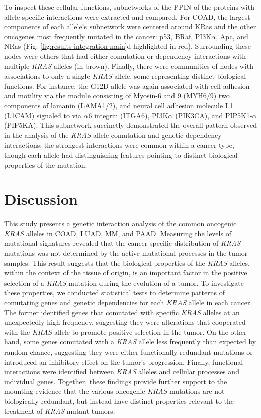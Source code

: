 \documentclass[english, 10pt, letterpaper]{article}
\newcommand{\KRAS}{\emph{KRAS}}
\newcommand{\kras}{KRas}
\begin{document}
To inspect these cellular functions, subnetworks of the PPIN of the proteins with allele-specific interactions were extracted and compared.
For COAD, the largest components of each allele's subnetwork were centered around \kras{} and the other oncogenes most frequently mutated in the cancer: p53, BRaf, PI3K$\alpha$, Apc, and NRas (Fig. \ref{fig:results-integration-main}d highlighted in red).
Surrounding these nodes were others that had either comutation or dependency interactions with multiple \KRAS{} alleles (in brown).
Finally, there were communities of nodes with associations to only a single \KRAS{} allele, some representing distinct biological functions.
For instance, the G12D allele was again associated with cell adhesion and motility via the module consisting of Myosin-6 and 9 (MYH6/9) two components of lamanin (LAMA1/2), and neural cell adhesion molecule L1 (L1CAM) signaled to via $\alpha$6 integrin (ITGA6), PI3K$\alpha$ (PIK3CA), and PIP5K1-$\alpha$ (PIP5KA).
This subnetwork succinctly demonstrated the overall pattern observed in the analysis of the \KRAS{} allele comutation and genetic dependency interactions: the strongest interactions were common within a cancer type, though each allele had distinguishing features pointing to distinct biological properties of the mutation.



\section*{Discussion}

This study presents a genetic interaction analysis of the common oncogenic \KRAS{} alleles in COAD, LUAD, MM, and PAAD.
Measuring the levels of mutational signatures revealed that the cancer-specific distribution of \KRAS{} mutations was not determined by the active mutational processes in the tumor samples.
This result suggests that the biological properties of the \KRAS{} alleles, within the context of the tissue of origin, is an important factor in the positive selection of a \KRAS{} mutation during the evolution of a tumor.
To investigate these properties, we conducted statistical tests to determine patterns of comutating genes and genetic dependencies for each \KRAS{} allele in each cancer.
The former identified genes that comutated with specific \KRAS{} alleles at an unexpectedly high frequency, suggesting they were alterations that cooperated with the \KRAS{} allele to promote positive selection in the tumor.
On the other hand, some genes comutated with a \KRAS{} allele less frequently than expected by random chance, suggesting they were either functionally redundant mutations or introduced an inhibitory effect on the tumor's progression.
Finally, functional interactions were identified between \KRAS{} alleles and cellular processes and individual genes.
Together, these findings provide further support to the mounting evidence that the various oncogenic \KRAS{} mutations are not biologically redundant, but instead have distinct properties relevant to the treatment of \KRAS{} mutant tumors.
\end{document}

